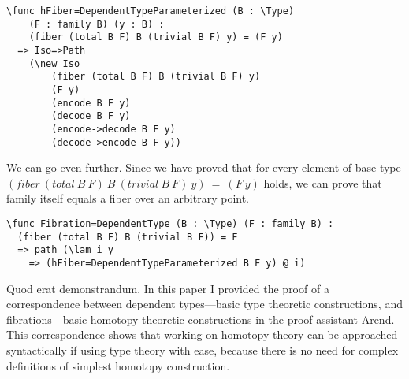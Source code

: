 \begin{ListingEnv}[H]
\begin{lstlisting}
\func hFiber=DependentTypeParameterized (B : \Type) 
	(F : family B) (y : B) : 
	(fiber (total B F) B (trivial B F) y) = (F y)
  => Iso=>Path 
  	(\new Iso 
  		(fiber (total B F) B (trivial B F) y) 
  		(F y) 
  		(encode B F y) 
  		(decode B F y) 
  		(encode->decode B F y) 
  		(decode->encode B F y))
\end{lstlisting}
\end{ListingEnv}
We can go even further. Since we have proved that for every element of base type $(fiber\ (total\ B\ F)\ B\ (trivial\ B\ F)\ y)\ =\ (F\ y)$ holds, we can prove that family itself equals a fiber over an arbitrary point.
\begin{ListingEnv}[H]
\begin{lstlisting}
\func Fibration=DependentType (B : \Type) (F : family B) : 
  (fiber (total B F) B (trivial B F)) = F
  => path (\lam i y
    => (hFiber=DependentTypeParameterized B F y) @ i)
\end{lstlisting}
\end{ListingEnv}
Quod erat demonstrandum.
\Conc
In this paper I provided the proof of a correspondence between dependent types---basic type theoretic constructions, and fibrations---basic homotopy theoretic constructions in the proof-assistant Arend. This correspondence shows that working on homotopy theory can be approached syntactically if using type theory with ease, because there is no need for complex definitions of simplest homotopy construction.
\begin{otherlanguage}{english}
\printbibliography[%
    heading=bibintoc%
    ,title=Bibliography
]
\end{otherlanguage}


